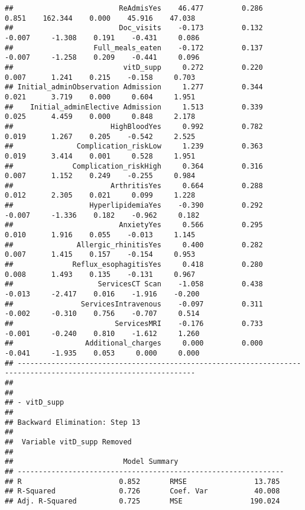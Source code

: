 \documentclass[
]{article}
\begin{document}
\begin{verbatim}
##                         ReAdmisYes    46.477         0.286        0.851    162.344    0.000    45.916    47.038 
##                         Doc_visits    -0.173         0.132       -0.007     -1.308    0.191    -0.431     0.086 
##                   Full_meals_eaten    -0.172         0.137       -0.007     -1.258    0.209    -0.441     0.096 
##                          vitD_supp     0.272         0.220        0.007      1.241    0.215    -0.158     0.703 
## Initial_adminObservation Admission     1.277         0.344        0.021      3.719    0.000     0.604     1.951 
##    Initial_adminElective Admission     1.513         0.339        0.025      4.459    0.000     0.848     2.178 
##                       HighBloodYes     0.992         0.782        0.019      1.267    0.205    -0.542     2.525 
##               Complication_riskLow     1.239         0.363        0.019      3.414    0.001     0.528     1.951 
##              Complication_riskHigh     0.364         0.316        0.007      1.152    0.249    -0.255     0.984 
##                       ArthritisYes     0.664         0.288        0.012      2.305    0.021     0.099     1.228 
##                  HyperlipidemiaYes    -0.390         0.292       -0.007     -1.336    0.182    -0.962     0.182 
##                         AnxietyYes     0.566         0.295        0.010      1.916    0.055    -0.013     1.145 
##               Allergic_rhinitisYes     0.400         0.282        0.007      1.415    0.157    -0.154     0.953 
##              Reflux_esophagitisYes     0.418         0.280        0.008      1.493    0.135    -0.131     0.967 
##                    ServicesCT Scan    -1.058         0.438       -0.013     -2.417    0.016    -1.916    -0.200 
##                ServicesIntravenous    -0.097         0.311       -0.002     -0.310    0.756    -0.707     0.514 
##                        ServicesMRI    -0.176         0.733       -0.001     -0.240    0.810    -1.612     1.260 
##                 Additional_charges     0.000         0.000       -0.041     -1.935    0.053     0.000     0.000 
## ----------------------------------------------------------------------------------------------------------------
## 
## 
## - vitD_supp 
## 
## Backward Elimination: Step 13 
## 
##  Variable vitD_supp Removed 
## 
##                          Model Summary                          
## ---------------------------------------------------------------
## R                       0.852       RMSE                13.785 
## R-Squared               0.726       Coef. Var           40.008 
## Adj. R-Squared          0.725       MSE                190.024 

\end{verbatim}
\end{document}
